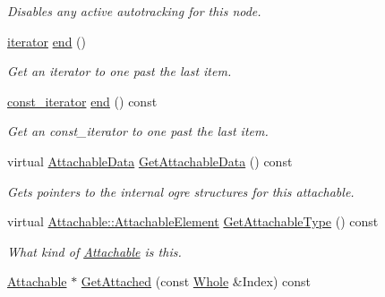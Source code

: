 \begin{DoxyCompactItemize}
\begin{DoxyCompactList}\small\item\em Disables any active autotracking for this node. \item\end{DoxyCompactList}\item 
\hyperlink{classMezzanine_1_1WorldNode_a2057d95435b0675936fe71ccb047f261}{iterator} \hyperlink{classMezzanine_1_1WorldNode_a8897f8140ad6677add5fc89f5893f488}{end} ()
\begin{DoxyCompactList}\small\item\em Get an iterator to one past the last item. \item\end{DoxyCompactList}\item 
\hyperlink{classMezzanine_1_1WorldNode_aa7097dbbb9b0920f6d9952e3315227fa}{const\_\-iterator} \hyperlink{classMezzanine_1_1WorldNode_ac114e0c9e40b99fc8e2ff80cdac39c7d}{end} () const 
\begin{DoxyCompactList}\small\item\em Get an const\_\-iterator to one past the last item. \item\end{DoxyCompactList}\item 
virtual \hyperlink{structMezzanine_1_1AttachableData}{AttachableData} \hyperlink{classMezzanine_1_1WorldNode_a9bbabb7b15f63c40bd3d563d9dd277a2}{GetAttachableData} () const 
\begin{DoxyCompactList}\small\item\em Gets pointers to the internal ogre structures for this attachable. \item\end{DoxyCompactList}\item 
virtual \hyperlink{classMezzanine_1_1Attachable_a274bd45f9666f6e50f6fdd8a0162bc9e}{Attachable::AttachableElement} \hyperlink{classMezzanine_1_1WorldNode_a98048b61fe6493bee14d247aab1c8a1f}{GetAttachableType} () const 
\begin{DoxyCompactList}\small\item\em What kind of \hyperlink{classMezzanine_1_1Attachable}{Attachable} is this. \item\end{DoxyCompactList}\item 
\hyperlink{classMezzanine_1_1Attachable}{Attachable} $\ast$ \hyperlink{classMezzanine_1_1WorldNode_a3673b8846216b3f1e7d0a63225a4f9f1}{GetAttached} (const \hyperlink{namespaceMezzanine_adcbb6ce6d1eb4379d109e51171e2e493}{Whole} \&Index) const 

\end{DoxyCompactItemize}
